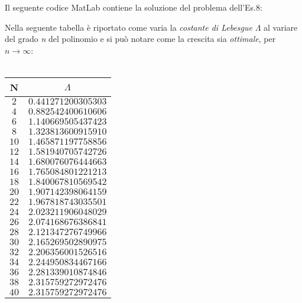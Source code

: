 Il seguente codice MatLab contiene la soluzione del problema dell'Es.8:
	
Nella seguente tabella è riportato come varia la \textit{costante di Lebesgue} $\Lambda$
al variare del grado \textit{n} del polinomio e si può notare come la crescita sia \textit{ottimale}, per $n\rightarrow\infty$:\\\
	\begin{center}
		\begin{tabular}{|c|c|}
			\hline
				N & $\Lambda$ \\
    		\hline
    			$2$  & $0.441271200305303$ \\ 
    			$4$  & $0.882542400610606$ \\ 
    			$6$  & $1.140669505437423$ \\ 
    			$8$  & $1.323813600915910$ \\ 
    			$10$ & $1.465871197758856$ \\ 
    			$12$ & $1.581940705742726$ \\ 
    			$14$ & $1.680076076444663$ \\ 
    			$16$ & $1.765084801221213$ \\ 
   				$18$ & $1.840067810569542$ \\ 
    			$20$ & $1.907142398064159$ \\ 
    			$22$ & $1.967818743035501$ \\ 
    			$24$ & $2.023211906048029$ \\ 
    			$26$ & $2.074168676386841$ \\ 
    			$28$ & $2.121347276749966$ \\ 
    			$30$ & $2.165269502890975$ \\ 
    			$32$ & $2.206356001526516$ \\ 
    			$34$ & $2.244950834467166$ \\ 
    			$36$ & $2.281339010874846$ \\ 
    			$38$ & $2.315759272972476$ \\ 
    			$40$ & $2.315759272972476$ \\ 
			\hline
		\end{tabular}
	\end{center}
